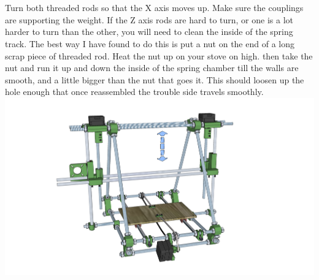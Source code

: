 \documentclass[twoside,a4paper,titlepage]{memoir}
\begin{document}
	\section{}
	Turn both threaded rods so that the X axis moves up. Make sure the couplings are supporting the
	weight. If the Z axis rods are hard to turn, or one is a lot harder to turn than the other, you will need to
	clean the inside of the spring track. The best way I have found to do this is put a nut on the end of a
	long scrap piece of threaded rod. Heat the nut up on your stove on high. then take the nut and run it up
	and down the inside of the spring chamber till the walls are smooth, and a little bigger than the nut that
	goes it. This should loosen up the hole enough that once reassembled the trouble side travels
	smoothly.\\
	\includegraphics[width=1\linewidth]{graphics/ch8_23.png}
	
\end{document}
